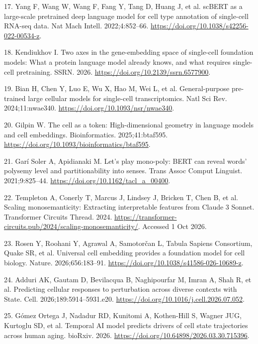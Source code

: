 \documentclass[
  11pt,
]{article}
\newlength{\cslhangindent}
\newenvironment{CSLReferences}[2] %
 {\begin{list}{}{%
  \setlength{\itemindent}{0pt}
  \setlength{\leftmargin}{0pt}
  \setlength{\parsep}{0pt}
  \ifodd #1
   \setlength{\leftmargin}{\cslhangindent}
   \setlength{\itemindent}{-1\cslhangindent}
  \fi
  \setlength{\itemsep}{#2\baselineskip}}}
 {\end{list}}
\begin{document}
\begin{CSLReferences}{0}{1}
17. Yang F, Wang W, Wang F, Fang Y, Tang D, Huang J, et al. {scBERT} as
a large-scale pretrained deep language model for cell type annotation of
single-cell {RNA-seq} data. Nat Mach Intell. 2022;4:852--66.
\url{https://doi.org/10.1038/s42256-022-00534-z}.

18. Kendiukhov I. Two axes in the gene-embedding space of single-cell
foundation models: What a protein language model already knows, and what
requires single-cell pretraining. SSRN. 2026.
\url{https://doi.org/10.2139/ssrn.6577900}.

19. Bian H, Chen Y, Luo E, Wu X, Hao M, Wei L, et al. General-purpose
pre-trained large cellular models for single-cell transcriptomics. Natl
Sci Rev. 2024;11:nwae340. \url{https://doi.org/10.1093/nsr/nwae340}.

20. Gilpin W. The cell as a token: High-dimensional geometry in language
models and cell embeddings. Bioinformatics. 2025;41:btaf595.
\url{https://doi.org/10.1093/bioinformatics/btaf595}.

21. Garí Soler A, Apidianaki M. Let's play mono-poly: {BERT} can reveal
words' polysemy level and partitionability into senses. Trans Assoc
Comput Linguist. 2021;9:825--44.
\url{https://doi.org/10.1162/tacl_a_00400}.

22. {Templeton A, Conerly T, Marcus J, Lindsey J, Bricken T, Chen B, et
al.} Scaling monosemanticity: Extracting interpretable features from
{Claude} 3 {Sonnet}. Transformer Circuits Thread. 2024.
\url{https://transformer-circuits.pub/2024/scaling-monosemanticity/}.
Accessed 1 Oct 2026.

23. Rosen Y, Roohani Y, Agrawal A, Samotorčan L, Tabula Sapiens
Consortium, Quake SR, et al. Universal cell embedding provides a
foundation model for cell biology. Nature. 2026;656:183--91.
\url{https://doi.org/10.1038/s41586-026-10689-z}.

24. {Adduri AK, Gautam D, Bevilacqua B, Naghipourfar M, Imran A, Shah R,
et al.} Predicting cellular responses to perturbation across diverse
contexts with {State}. Cell. 2026;189:5914--5931.e20.
\url{https://doi.org/10.1016/j.cell.2026.07.052}.

25. {Gómez Ortega J, Nadadur RD, Kunitomi A, Kothen-Hill S, Wagner JUG,
Kurtoglu SD, et al.} Temporal {AI} model predicts drivers of cell state
trajectories across human aging. bioRxiv. 2026.
\url{https://doi.org/10.64898/2026.03.30.715396}.


\end{CSLReferences}
\end{document}
